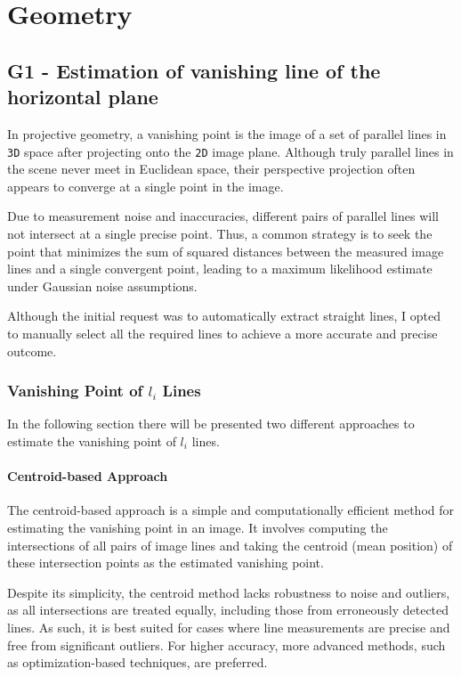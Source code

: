 \chapter{Geometry}
\section{G1 - Estimation of vanishing line of the horizontal plane}\label{infLine}
In projective geometry, a vanishing point is the image of a set of parallel lines in \verb|3D| space after projecting onto the \verb|2D| image plane. Although truly parallel lines in the scene never meet in Euclidean space, their perspective projection often appears to converge at a single point in the image.

Due to measurement noise and inaccuracies, different pairs of parallel lines will not intersect at a single precise point. Thus, a common strategy is to seek the point that minimizes the sum of squared distances between the measured image lines and a single convergent point, leading to a maximum likelihood estimate under Gaussian noise assumptions.

Although the initial request was to automatically extract straight lines, I opted to manually select all the required lines to achieve a more accurate and precise outcome.

\subsection[Vanishing Point of \textit{l} Lines]{Vanishing Point of $l_i$ Lines} \label{sec:vanPoint_l}
In the following section there will be presented two different approaches to estimate the vanishing point of $l_i$ lines. 

\subsubsection{Centroid-based Approach}
The centroid-based approach is a simple and computationally efficient method for estimating the vanishing point in an image. It involves computing the intersections of all pairs of image lines and taking the centroid (mean position) of these intersection points as the estimated vanishing point.

Despite its simplicity, the centroid method lacks robustness to noise and outliers, as all intersections are treated equally, including those from erroneously detected lines. As such, it is best suited for cases where line measurements are precise and free from significant outliers. For higher accuracy, more advanced methods, such as optimization-based techniques, are preferred.

